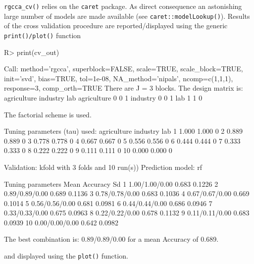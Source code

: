 \documentclass[
]{jss}
\begin{document}
\texttt{rgcca\_cv()} relies on the \texttt{caret} package. As direct
consequence an astonishing large number of models are made available
(see \texttt{caret::modelLookup()}). Results of the cross validation
procedure are reported/displayed using the generic
\texttt{print()/plot()} function

\footnotesize

\begin{CodeChunk}
\begin{CodeInput}
R> print(cv_out)
\end{CodeInput}
\begin{CodeOutput}
Call: method='rgcca', superblock=FALSE, scale=TRUE, scale_block=TRUE, init='svd',
bias=TRUE, tol=1e-08, NA_method='nipals', ncomp=c(1,1,1), response=3,
comp_orth=TRUE 
There are J = 3 blocks.
The design matrix is:
            agriculture industry lab
agriculture           0        0   1
industry              0        0   1
lab                   1        1   0

The factorial scheme is used.

Tuning parameters (tau) used: 
   agriculture industry lab
1        1.000    1.000   0
2        0.889    0.889   0
3        0.778    0.778   0
4        0.667    0.667   0
5        0.556    0.556   0
6        0.444    0.444   0
7        0.333    0.333   0
8        0.222    0.222   0
9        0.111    0.111   0
10       0.000    0.000   0

Validation: kfold with 3 folds and 10 run(s)) 
Prediction model: rf 

   Tuning parameters Mean Accuracy     Sd
1     1.00/1.00/0.00         0.683 0.1226
2     0.89/0.89/0.00         0.689 0.1136
3     0.78/0.78/0.00         0.683 0.1036
4     0.67/0.67/0.00         0.669 0.1014
5     0.56/0.56/0.00         0.681 0.0981
6     0.44/0.44/0.00         0.686 0.0946
7     0.33/0.33/0.00         0.675 0.0963
8     0.22/0.22/0.00         0.678 0.1132
9     0.11/0.11/0.00         0.683 0.0939
10    0.00/0.00/0.00         0.642 0.0982

The best combination is: 0.89/0.89/0.00 for a mean Accuracy of 0.689.
\end{CodeOutput}
\end{CodeChunk}

\normalsize

and displayed using the \texttt{plot()} function.

\footnotesize
\end{document}
